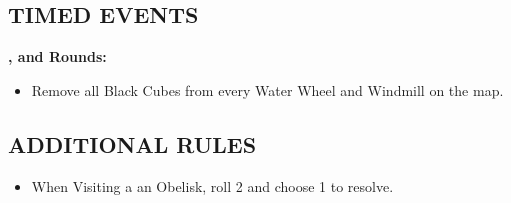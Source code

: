 \begin{multicols}{2}

\subsection*{\MakeUppercase{Timed Events}}

\textbf{,  and  Rounds:}
\begin{itemize}
  \item Remove all Black Cubes from every Water Wheel and Windmill on the map.
\end{itemize}

\subsection*{\MakeUppercase{Additional Rules}}

\begin{itemize}
  \item When Visiting a an Obelisk, roll 2  and choose 1 to resolve.
\end{itemize}

\end{multicols}
